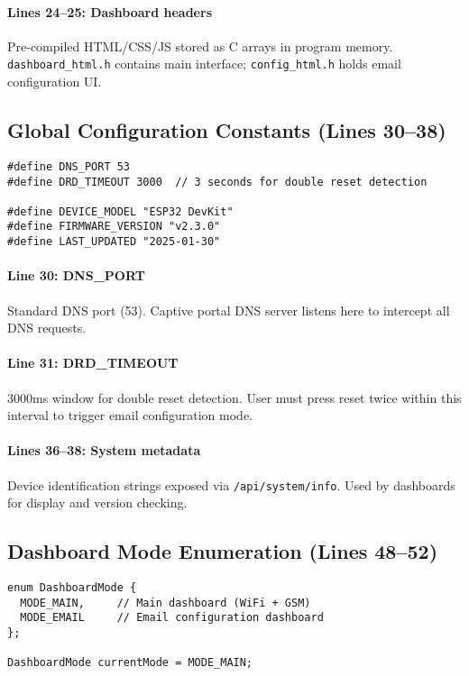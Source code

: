 \documentclass[11pt,a4paper]{article}
\begin{document}
\paragraph{Lines 24--25: Dashboard headers}
Pre-compiled HTML/CSS/JS stored as C arrays in program memory. \texttt{dashboard\_html.h} contains main interface; \texttt{config\_html.h} holds email configuration UI.

\subsection{Global Configuration Constants (Lines 30--38)}

\begin{verbatim}
#define DNS_PORT 53
#define DRD_TIMEOUT 3000  // 3 seconds for double reset detection

#define DEVICE_MODEL "ESP32 DevKit"
#define FIRMWARE_VERSION "v2.3.0"
#define LAST_UPDATED "2025-01-30"
\end{verbatim}

\paragraph{Line 30: DNS\_PORT}
Standard DNS port (53). Captive portal DNS server listens here to intercept all DNS requests.

\paragraph{Line 31: DRD\_TIMEOUT}
3000ms window for double reset detection. User must press reset twice within this interval to trigger email configuration mode.

\paragraph{Lines 36--38: System metadata}
Device identification strings exposed via \texttt{/api/system/info}. Used by dashboards for display and version checking.

\subsection{Dashboard Mode Enumeration (Lines 48--52)}

\begin{verbatim}
enum DashboardMode {
  MODE_MAIN,     // Main dashboard (WiFi + GSM)
  MODE_EMAIL     // Email configuration dashboard
};

DashboardMode currentMode = MODE_MAIN;
\end{verbatim}
\end{document}
